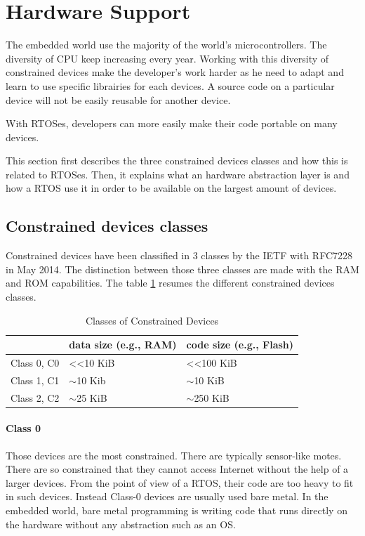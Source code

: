 \section{Hardware Support}

The embedded world use the majority of the world's microcontrollers.
The diversity of CPU keep increasing every year.
Working with this diversity of constrained devices make the developer's work harder as he need to adapt and learn to use specific librairies for each devices.
A source code on a particular device will not be easily reusable for another device.

With RTOSes, developers can more easily make their code portable on many devices.

This section first describes the three constrained devices classes and how this is related to RTOSes.
Then, it explains what an hardware abstraction layer is and how a RTOS use it in order to be available on the largest amount of devices.

\subsection{Constrained devices classes}

Constrained devices have been classified in 3 classes by the IETF with RFC7228 in May 2014. The distinction between those three classes are made with the RAM and ROM capabilities.
The table \ref{tab:constrained-devices-classes} resumes the different constrained devices classes.

\begin{table}[!h]
  \centering
  \begin{tabular}{|l|l|l|}
  \hline
   & data size (e.g., RAM) & code size (e.g., Flash) \\ \hline
  Class 0, C0 & \textless{}\textless 10 KiB & \textless{}\textless 100 KiB \\ %
  Class 1, C1 & $\sim$10 Kib & $\sim$10 KiB \\ %
  Class 2, C2 & $\sim$25 KiB & $\sim$250 KiB \\ \hline
  \end{tabular}
  \caption{Classes of Constrained Devices}
  \label{tab:constrained-devices-classes}
\end{table}

\paragraph{Class 0}
Those devices are the most constrained.
There are typically sensor-like motes.
There are so constrained that they cannot access Internet without the help of a larger devices.
From the point of view of a RTOS, their code are too heavy to fit in such devices.
Instead Class-0 devices are usually used bare metal.
In the embedded world, bare metal programming is writing code that runs directly on the hardware without any abstraction such as an OS.

